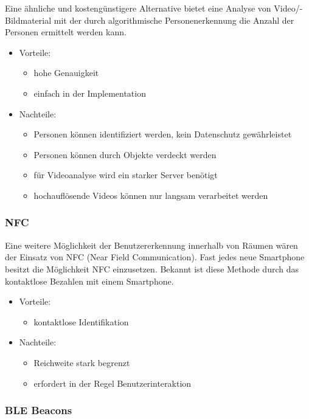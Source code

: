 Eine ähnliche und kostengünstigere Alternative bietet eine Analyse von
Video/- \bzw Bildmaterial mit der durch algorithmische Personenerkennung die
Anzahl der Personen ermittelt werden kann.

\begin{itemize}
	\item Vorteile:
	\begin{itemize}
		\item hohe Genauigkeit
		\item einfach in der Implementation
	\end{itemize}
	\item Nachteile:
	\begin{itemize}
		\item Personen können identifiziert werden, kein Datenschutz gewährleistet
		\item Personen können durch Objekte verdeckt werden
		\item für Videoanalyse wird ein starker Server benötigt
		\item hochauflösende Videos können nur langsam verarbeitet werden
	\end{itemize}
\end{itemize}


\subsubsection{NFC}
\label{sec:NFC}

Eine weitere Möglichkeit der Benutzererkennung innerhalb von Räumen wären der
Einsatz von NFC (Near Field Communication). 
Fast jedes neue Smartphone besitzt die Möglichkeit NFC einzusetzen. Bekannt ist
diese Methode \zB durch das kontaktlose Bezahlen mit einem Smartphone.

\begin{itemize}
	\item Vorteile:
	\begin{itemize}
		\item kontaktlose Identifikation
	\end{itemize}
	\item Nachteile:
	\begin{itemize}
		\item Reichweite stark begrenzt
		\item erfordert in der Regel Benutzerinteraktion
	\end{itemize}
\end{itemize}


\subsubsection{BLE Beacons}
\label{sec:BLE_Beacons}


